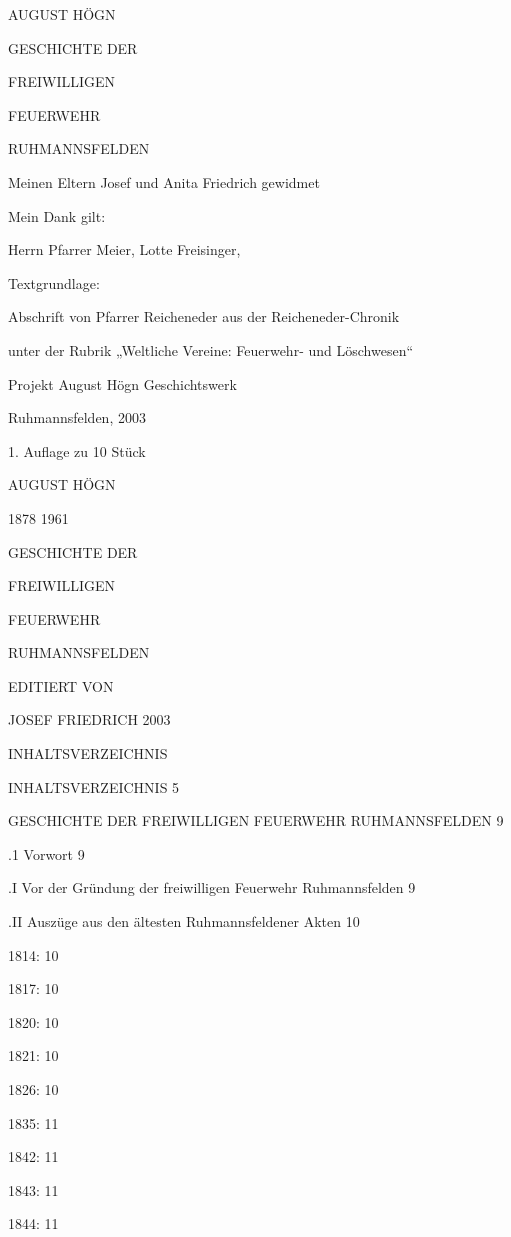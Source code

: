 \documentclass{book}
\begin{document}
AUGUST HÖGN

GESCHICHTE DER

FREIWILLIGEN

FEUERWEHR

RUHMANNSFELDEN

Meinen Eltern Josef und Anita Friedrich gewidmet

Mein Dank gilt:

Herrn Pfarrer Meier, Lotte Freisinger,

Textgrundlage:

Abschrift von Pfarrer Reicheneder aus der Reicheneder-Chronik

unter der Rubrik „Weltliche Vereine: Feuerwehr- und Löschwesen“

Projekt August Högn Geschichtswerk

Ruhmannsfelden, 2003

1. Auflage zu 10 Stück



AUGUST HÖGN

1878 1961





GESCHICHTE DER

FREIWILLIGEN

FEUERWEHR

RUHMANNSFELDEN






EDITIERT VON

JOSEF FRIEDRICH 2003





INHALTSVERZEICHNIS

INHALTSVERZEICHNIS  5

GESCHICHTE DER FREIWILLIGEN FEUERWEHR RUHMANNSFELDEN    9

.1 Vorwort  9

.I Vor der Gründung der freiwilligen Feuerwehr Ruhmannsfelden   9

.II Auszüge aus den ältesten Ruhmannsfeldener Akten 10

1814:   10

1817:   10

1820:   10

1821:   10

1826:   10

1835:   11

1842:   11

1843:   11

1844:   11
\end{document}
